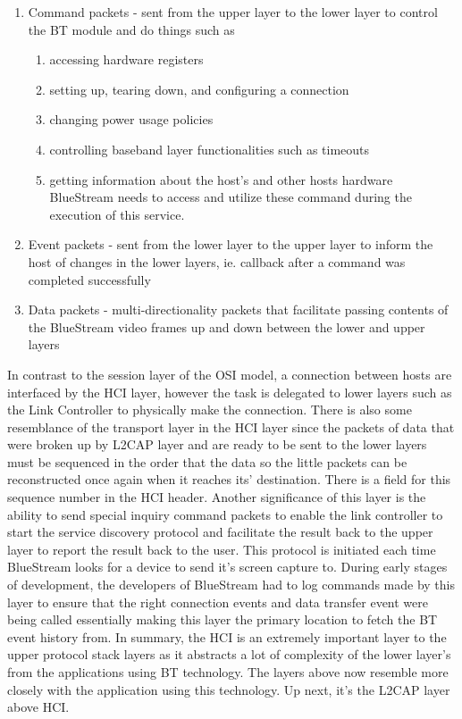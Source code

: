 \documentclass[a4paper,12pt]{article}
\begin{document}
\begin{enumerate}
\item Command packets - sent from the upper layer to the lower layer to control the BT module and do things such as
    \begin{enumerate}
    \item accessing hardware registers
    \item setting up, tearing down, and configuring a connection
    \item changing power usage policies
    \item controlling baseband layer functionalities such as timeouts
    \item getting information about the host’s and other hosts hardware BlueStream needs to access and utilize these command during the execution of this service.
    \end{enumerate}
\item Event packets - sent from the lower layer to the upper layer to inform the host of changes in the lower layers, ie. callback after a command was completed successfully
\item Data packets - multi-directionality packets that facilitate passing contents of the BlueStream video frames up and down between the lower and upper layers    
\end{enumerate}

In contrast to the session layer of the OSI model, a connection between hosts are interfaced by the HCI layer, however the task is delegated to lower layers such as the Link Controller to physically make the connection. There is also some resemblance of the transport layer in the HCI layer since the packets of data that were broken up by L2CAP layer and are ready to be sent to the lower layers must be sequenced in the order that the data so the little packets can be reconstructed once again when it reaches its’ destination. There is a field for this sequence number in the HCI header. Another significance of this layer is the ability to send special inquiry command packets to enable the link controller to start the service discovery protocol and facilitate the result back to the upper layer to report the result back to the user. This protocol is initiated each time BlueStream looks for a device to send it’s screen capture to. During early stages of development, the developers of BlueStream had to log commands made by this layer to ensure that the right connection events and data transfer event were being called essentially making this layer the primary location to fetch the BT event history from. In summary, the HCI is an extremely important layer to the upper protocol stack layers as it abstracts a lot of complexity of the lower layer’s from the applications using BT technology. The layers above now resemble more closely with the application using this technology. Up next, it’s the L2CAP layer above HCI. 
\end{document}
